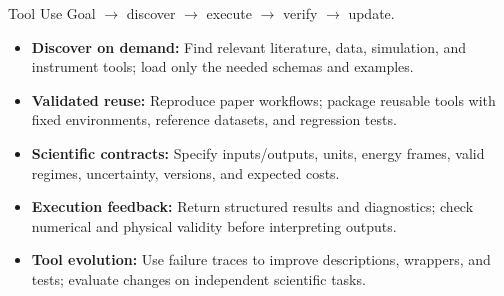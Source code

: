 \begin{frame}[t,label=md-51]{Tool Use}
\small
{}
\smallskip
Goal $\rightarrow$ discover $\rightarrow$ execute $\rightarrow$ verify $\rightarrow$ update.
\medskip
\begin{itemize}
\setlength{\itemsep}{0.55em}
    \item \textbf{Discover on demand:} Find relevant literature, data, simulation,
    and instrument tools; load only the needed schemas and examples.
    \item \textbf{Validated reuse:} Reproduce paper workflows; package reusable
    tools with fixed environments, reference datasets, and regression tests.
    \item \textbf{Scientific contracts:} Specify inputs/outputs, units, energy
    frames, valid regimes, uncertainty, versions, and expected costs.
    \item \textbf{Execution feedback:} Return structured results and diagnostics;
    check numerical and physical validity before interpreting outputs.
    \item \textbf{Tool evolution:} Use failure traces to improve descriptions,
    wrappers, and tests; evaluate changes on independent scientific tasks.
\end{itemize}
\end{frame}

